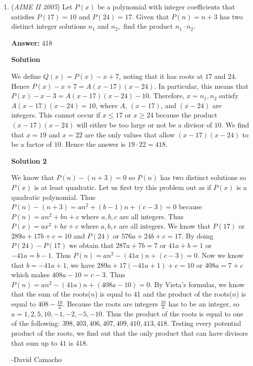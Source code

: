 \begin{enumerate}
 


	\item (\textit{AIME II 2005}) Let $P(x)$ be a polynomial with integer coefficients that satisfies $P(17)=10$ and $P(24)=17.$ Given that $P(n)=n+3$ has two distinct integer solutions $n_1$ and $n_2,$ find the product $n_1\cdot n_2.$

 \textbf{Answer: }418



\textbf{Solution}

We define $Q(x)=P(x)-x+7$, noting that it has roots at $17$ and $24$. Hence $P(x)-x+7=A(x-17)(x-24)$. In particular, this means that $P(x)-x-3=A(x-17)(x-24)-10$. Therefore, $x=n_1,n_2$ satisfy $A(x-17)(x-24)=10$, where $A$, $(x-17)$, and $(x-24)$ are integers. This cannot occur if $x\le 17$ or $x\ge 24$ because the product $(x-17)(x-24)$ will either be too large or not be a divisor of $10$. We find that $x=19$ and $x=22$ are the only values that allow $(x-17)(x-24)$ to be a factor of $10$.  Hence the answer is $19\cdot 22=\boxed{418}$.

 


 



\textbf{Solution 2}

We know that $P(n)-(n+3)=0$ so $P(n)$ has two distinct solutions so $P(x)$ is at least quadratic. Let us first try this problem out as if $P(x)$ is a quadratic polynomial. Thus $P(n)-(n+3)= an^2+(b-1)n+(c-3)=0$ because $P(n)=an^2+bn+c$ where $a,b,c$ are all integers. Thus $P(x)=ax^2+bx+c$ where $a,b,c$ are all integers. We know that $P(17)$ or $289a+17b+c=10$ and $P(24)$ or $576a+24b+c=17$. By doing $P(24)-P(17)$ we obtain that $287a+7b=7$ or $41a+b=1$ or $-41a=b-1$. Thus $P(n)=an^2- (41a)n+(c-3)=0$.  Now we know that $b=-41a+1$, we have $289a+17(-41a+1)+c=10$ or $408a=7+c$ which makes $408a-10=c-3$. Thus $P(n)=an^2-(41a)n+(408a-10)=0$. By Vieta's formulas, we know that the sum of the roots($n$) is equal to 41 and the product of the roots($n$) is equal to $408-\frac{10}{a}$. Because the roots are integers $\frac{10}{a}$ has to be an integer, so $a=1,2,5,10,-1,-2,-5,-10$. Thus the product of the roots is equal to one of the following: $398,403,406,407,409,410,413,418$. Testing every potential product of the roots, we find out that the only product that can have divisors that sum up to $41$ is $\boxed{418}$.

 -David Camacho

 




\end{enumerate}
